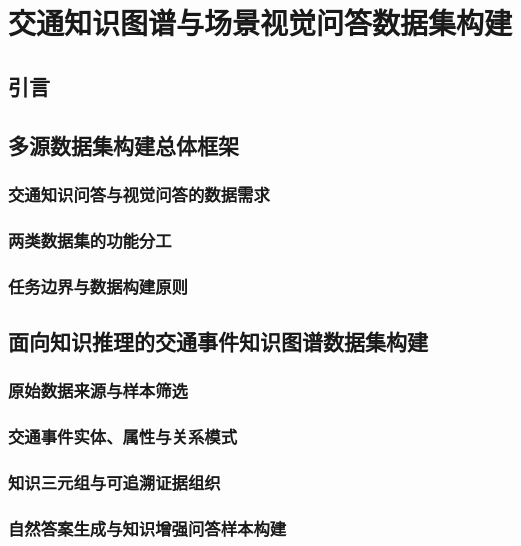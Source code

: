 
\chapter{交通知识图谱与场景视觉问答数据集构建}

\section{引言}

\section{多源数据集构建总体框架}

\subsection{交通知识问答与视觉问答的数据需求}

\subsection{两类数据集的功能分工}

\subsection{任务边界与数据构建原则}

\section{面向知识推理的交通事件知识图谱数据集构建}

\subsection{原始数据来源与样本筛选}

\subsection{交通事件实体、属性与关系模式}

\subsection{知识三元组与可追溯证据组织}

\subsection{自然答案生成与知识增强问答样本构建}

